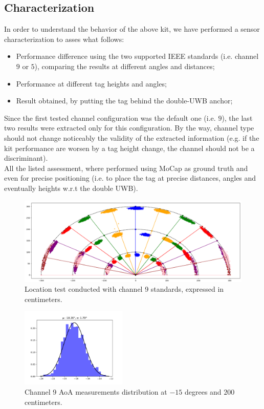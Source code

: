 \subsection{Characterization}
In order to understand the behavior of the above kit, we have performed a sensor characterization to asses what follows:
\begin{itemize}
    \item Performance difference using the two supported IEEE standards (i.e. channel $9$ or $5$), comparing the results at different angles and distances;
    \item Performance at different tag heights and angles;
    \item Result obtained, by putting the tag behind the double-UWB anchor;
\end{itemize}
Since the first tested channel configuration was the default one (i.e. $9$), the last two results were extracted only for this configuration. By the way, channel type should not change noticeably the validity of the extracted information (e.g. if the kit performance are worsen by a tag height change, the channel should not be a discriminant).\\
All the listed assessment, where performed using MoCap as ground truth and even for precise positioning (i.e. to place the tag at precise distances, angles and eventually heights w.r.t the double UWB).\\

\begin{figure}
    \centering
    \includegraphics[width=1.0\textwidth]{images/ch9_characterization.png}
    \caption{Location test conducted with channel 9 standards, expressed in centimeters.}
    \label{UWB:fig:ch9test}
\end{figure}

\begin{figure}
    \centering
    \includegraphics[width=0.45\textwidth]{images/ch9_aoa_hist.png}
    \caption{Channel 9 AoA measurements distribution at $-15$ degrees and $200$ centimeters.}
    \label{UWB:fig:AoA_ch9}
\end{figure}

